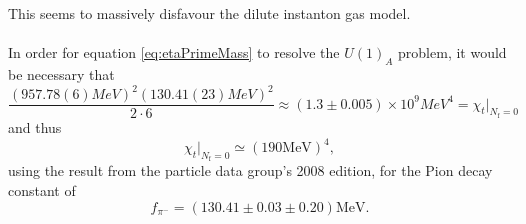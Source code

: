 \documentclass[a4paper,10pt]{book}
\begin{document}
This seems to massively disfavour the dilute instanton gas model.\\\\In order for equation \eqref{eq:etaPrimeMass} to resolve the $U(1)_A$ problem, it would be necessary that
\begin{equation}
\frac{(957.78(6)MeV)^2(130.41(23)MeV)^2}{2\cdot 6} \approx (1.3\pm 0.005)\times10^9 MeV^4 = \chi_{t}\big|_{N_{\mathrm{f}}=0}
\end{equation}
and thus
\begin{equation}
\chi_{t}\big|_{N_{\mathrm{f}}=0} \simeq(190 \mathrm{MeV})^{4},
\end{equation}
using the result from the particle data group's 2008 edition, for the Pion decay constant of \cite{https://doi.org/10.48550/arxiv.0802.1043}
\begin{equation}
f_{\pi^{-}}=(130.41 \pm 0.03 \pm 0.20) \mathrm{MeV}.
\end{equation}
\end{document}
